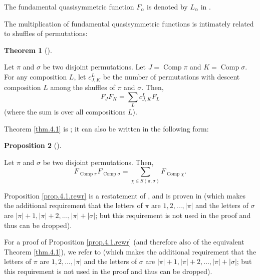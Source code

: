 \documentclass[numbers=enddot,12pt,final,onecolumn,notitlepage]{scrartcl}%
\theoremstyle{definition}
\newtheorem{theo}{Theorem}[section]
\newenvironment{theorem}[1][]
{\begin{theo}[#1]\begin{leftbar}}
{\end{leftbar}\end{theo}}
\newtheorem{prop}[theo]{Proposition}
\newenvironment{proposition}[1][]
{\begin{prop}[#1]\begin{leftbar}}
{\end{leftbar}\end{prop}}
\newenvironment{verlong}{}{}
\newenvironment{vershort}{}{}
\let\sumnonlimits\sum
\renewcommand{\sum}{\sumnonlimits\limits}
\begin{document}
The fundamental quasisymmetric function $F_{\alpha}$ is denoted
by $L_{\alpha}$ in \cite[\S 5.2]{HopfComb}.

The multiplication of fundamental quasisymmetric functions is intimately
related to shuffles of permutations:

\begin{verlong}
\begin{theorem}
\label{thm.4.1}Let $\pi$ and $\sigma$ be two disjoint permutations. Let
$J=\operatorname*{Comp}\pi$ and $K=\operatorname*{Comp}\sigma$. For any
composition $L$, let $c_{J,K}^{L}$ be the number of permutations with descent
composition $L$ among the shuffles of $\pi$ and $\sigma$. Then,%
\[
F_{J}F_{K}=\sum_{L}c_{J,K}^{L}F_{L}%
\]
(where the sum is over all compositions $L$).
\end{theorem}

Theorem \ref{thm.4.1} is \cite[Theorem 4.1]{part1}; it can also be written in
the following form:
\end{verlong}

\begin{proposition}
\label{prop.4.1.rewr}Let $\pi$ and $\sigma$ be two disjoint permutations.
Then,%
\[
F_{\operatorname*{Comp}\pi}F_{\operatorname*{Comp}\sigma}=\sum_{\chi\in
S\left(  \pi,\sigma\right)  }F_{\operatorname*{Comp}\chi}.
\]

\end{proposition}

\begin{vershort}
Proposition \ref{prop.4.1.rewr} is a restatement of \cite[Theorem 4.1]{part1},
and is proven in \cite[(5.2.6)]{HopfComb} (which makes the additional
requirement that the letters of $\pi$ are $1,2,\ldots,\left\vert
\pi\right\vert $ and the letters of $\sigma$ are $\left\vert \pi\right\vert
+1,\left\vert \pi\right\vert +2,\ldots,\left\vert \pi\right\vert +\left\vert
\sigma\right\vert $; but this requirement is not used in the proof and thus
can be dropped).
\end{vershort}

\begin{verlong}
For a proof of Proposition \ref{prop.4.1.rewr} (and therefore also of the
equivalent Theorem \ref{thm.4.1}), we refer to \cite[(5.2.6)]{HopfComb} (which
makes the additional requirement that the letters of $\pi$ are $1,2,\ldots
,\left\vert \pi\right\vert $ and the letters of $\sigma$ are $\left\vert
\pi\right\vert +1,\left\vert \pi\right\vert +2,\ldots,\left\vert
\pi\right\vert +\left\vert \sigma\right\vert $; but this requirement is not
used in the proof and thus can be dropped).
\end{verlong}
\end{document}
